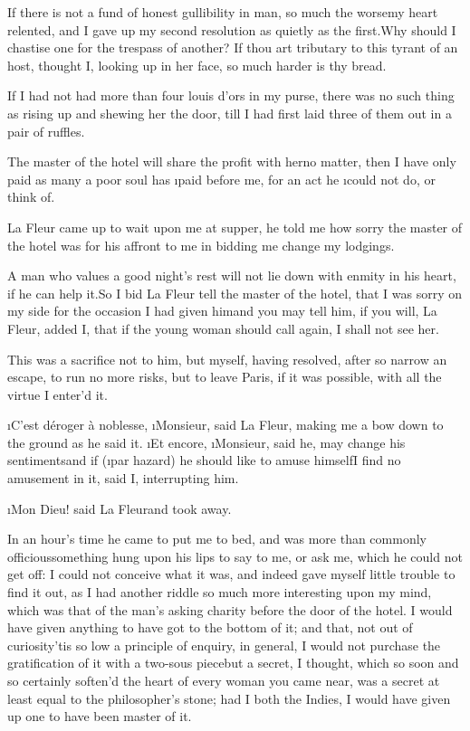 \documentclass[twoside]{article}
\begin{document}
If there is not a fund of honest
gullibility in man, so much the
worse\tskk my heart relented, and I gave
up my second resolution as quietly as the
first.\tskk Why should I chastise one for
the trespass of another?  If thou art
tributary to this tyrant of an host,
thought I, looking up in her face, so much
harder is thy bread.

If I had not had more than four louis
d’ors in my purse, there was no such thing
as rising up and shewing her the door,
till I had first laid three of them out in
a pair of ruffles.

\tskk The master of the hotel will share
the profit with her\tskk no matter,\tskk
then I have only paid as many a poor soul
has \i{paid} before me, for an act he
\i{could} not do, or think of.





\vskip 6pt


 La Fleur came up to wait
upon me at supper, he told me how sorry
the master of the hotel was for his
affront to me in bidding me change my
lodgings.

A man who values a good night’s rest will
not lie down with enmity in his heart, if
he can help it.\tskk So I bid La Fleur
tell the master of the hotel, that I was
sorry on my side for the occasion I had
given him\tskk and you may tell him, if
you will, La Fleur, added I, that if the
young woman should call again, I shall not
see her.

This was a sacrifice not to him, but
myself, having resolved, after so narrow
an escape, to run no more risks, but to
leave Paris, if it was possible, with all
the virtue I enter’d it.

\i{C’est déroger à noblesse},
\i{Monsieur}, said La Fleur, making me a
bow down to the ground as he said it.\tskk
\i{Et encore}, \i{Monsieur}, said he, may
change his sentiments\tskk and if (\i{par
hazard}) he should like to amuse
himself\tskk I find no amusement in it,
said I, interrupting him.\tskk 

\i{Mon Dieu}! said La Fleur\tskk and took
away.

In an hour’s time he came to put me to
bed, and was more than commonly
officious\tskk something hung upon his
lips to say to me, or ask me, which he
could not get off: I could not conceive
what it was, and indeed gave myself little
trouble to find it out, as I had another
riddle so much more interesting upon my
mind, which was that of the man’s asking
charity before the door of the hotel.\tskk
I would have given anything to have got to
the bottom of it; and that, not out of
curiosity\tskk ’tis so low a principle of
enquiry, in general, I would not purchase
the gratification of it with a two-sous
piece\tskk but a secret, I thought, which
so soon and so certainly soften’d the
heart of every woman you came near, was a
secret at least equal to the philosopher’s
stone; had I both the Indies, I would have
given up one to have been master of it.
\end{document}
